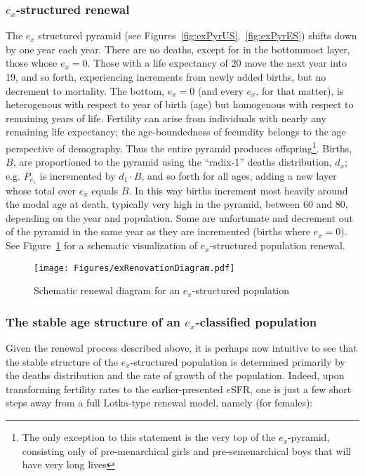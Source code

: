 \subsubsection{$e_x$-structured renewal}
The $e_x$ structured pyramid (see Figures~\ref{fig:exPyrUS},~\ref{fig:exPyrES})
shifts down by one year each year. There are no deaths, except for in 
the bottommost layer, those whose $e_x = 0$. Those with a life
expectancy of 20 move the next year into 19, and so forth, experiencing
increments from newly added births, but no decrement to mortality. The bottom,
$e_x = 0$ (and every $e_x$, for that matter), is heterogenous with 
respect to year of birth (age) but homogenous with respect to remaining 
years of life. Fertility can arise from individuals with nearly any remaining life
expectancy; the age-boundedness of fecundity belongs to the age
perspective of demography. Thus the entire pyramid produces offspring\footnote{The only exception
to this statement is the very top of the $e_x$-pyramid, consisting only of
pre-menarchical girls and pre-semenarchical boys that will have very long
lives}. Births, $B$, are proportioned to the pyramid using the ``radix-1''
deaths distribution, $d_x$; e.g. $P_{e_1}$ is incremented by $d_1 \cdot B$, and
so forth for all ages, adding a new layer whose total over $e_x$ equals $B$. In this way births
increment most heavily around the modal age at death, typically very high in the
pyramid, between 60 and 80, depending on the year and population. Some are
unfortunate and decrement out of the pyramid in the same year as they are
incremented (births where $e_x = 0$). See Figure~\ref{fig:exrenewal} for a
schematic visualization of $e_x$-structured population renewal.

\begin{figure}
\caption{Schematic renewal diagram for an $e_x$-structured population}
\label{fig:exrenewal}
\texttt{[image: Figures/exRenovationDiagram.pdf]}
\end{figure}

\subsubsection{The stable age structure of an $e_x$-classified population}
Given the renewal process described above, it is perhaps now intuitive to see
that the stable structure of the $e_x$-structured population is determined
primarily by the deaths distribution and the rate of growth of the
population. Indeed, upon transforming fertility rates to the earlier-presented
$e$SFR, one is just a few short steps away from a full Lotka-type renewal
model, namely (for females):


